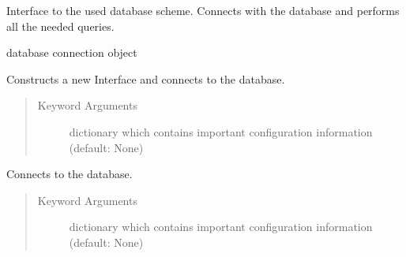 \documentclass[letterpaper,10pt,english]{sphinxmanual}
\begin{document}
\begin{fulllineitems}
\label{\detokenize{api:db_interface.DBInterface}}
Interface to the used database scheme. Connects with the database
and performs all the needed queries.

\begin{fulllineitems}
\label{\detokenize{api:db_interface.DBInterface.db}}
database connection object

\end{fulllineitems}


\begin{fulllineitems}
\label{\detokenize{api:db_interface.DBInterface.__init__}}
Constructs a new Interface and connects to the database.
\begin{quote}\begin{description}
\item[{Keyword Arguments}] \leavevmode
{} \textendash{} dictionary which contains important configuration
information (default: None)

\end{description}\end{quote}

\end{fulllineitems}


\begin{fulllineitems}
\label{\detokenize{api:db_interface.DBInterface.connect}}
Connects to the database.
\begin{quote}\begin{description}
\item[{Keyword Arguments}] \leavevmode
{} \textendash{} dictionary which contains important configuration
information (default: None)

\end{description}\end{quote}


\end{fulllineitems}
\end{fulllineitems}
\end{document}
